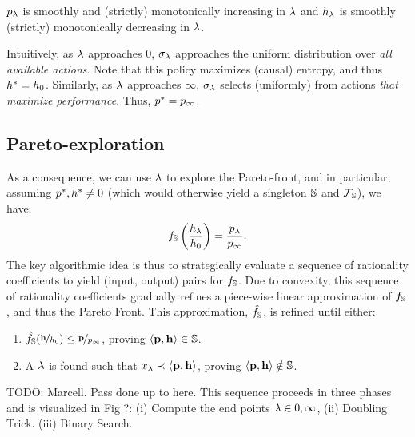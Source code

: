 \begin{proposition}
  $p_\lambda$ is smoothly and (strictly) monotonically increasing in $\lambda$ and $h_\lambda$
  is smoothly (strictly) monotonically decreasing in $\lambda$.
\end{proposition}

Intuitively, as $\lambda$ approaches $0$, $\sigma_\lambda$ approaches the
uniform distribution over \emph{all available actions}. Note that this
policy maximizes (causal) entropy, and thus $h^{*} = h_0$.
Similarly, as $\lambda$ approaches $\infty$, $\sigma_\lambda$ selects (uniformly) from
actions \emph{that maximize performance}. Thus, $p^{*} = p_\infty$.

\subsection{Pareto-exploration}
As a consequence, we can use $\lambda$ to explore the Pareto-front, and
in particular, assuming $p^{*}, h^{*} \neq 0$ (which would otherwise yield a singleton
$\mathbb{S}$ and $\mathcal{F}_{\mathbb{S}}$), we have:
\begin{equation}
  f_\mathbb{S}\left(\frac{h_\lambda}{h_0}\right) = \frac{p_\lambda}{p_\infty}.
\end{equation}
The key algorithmic idea is thus to strategically evaluate a sequence
of rationality coefficients to yield (input, output) pairs for
$f_\mathbb{S}$. Due to convexity, this sequence of rationality
coefficients gradually refines a piece-wise linear approximation of
$f_\mathbb{S}$, and thus the Pareto Front. This approximation, $\hat{f_\mathbb{S}}$, is refined
until either:
\begin{enumerate}
  \item $\hat{f_\mathbb{S}}(\nicefrac{\mathbf{h}}{h_0}) \leq \nicefrac{\mathbf{p}}{p_\infty}$, proving $\langle \mathbf{p},
\mathbf{h} \rangle \in \mathbb{S}$.
\item A $\lambda$ is found such that $x_{\lambda} \prec \langle
\mathbf{p}, \mathbf{h} \rangle$, proving $\langle \mathbf{p},
\mathbf{h} \rangle \notin \mathbb{S}$.

\end{enumerate}

TODO: Marcell. Pass done up to here.
This sequence proceeds in three phases and is visualized in Fig ?:
(i) Compute the end points $\lambda \in {0, \infty}$, (ii) Doubling Trick.
(iii) Binary Search.

